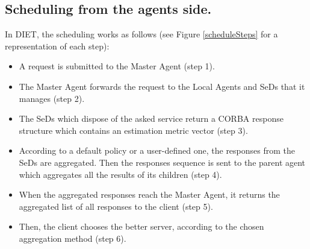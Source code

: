 \subsection{Scheduling from the agents side.}
In DIET, the scheduling works as follows (see Figure \ref{scheduleSteps} for
a representation of each step): 
\begin{itemize}
  \item A request is submitted to the Master Agent (step 1).
  \item The Master Agent forwards the request to the Local Agents and SeDs that
    it manages (step 2).
  \item The SeDs which dispose of the asked service return a CORBA response
    structure which contains an estimation metric vector (step 3).
  \item According to a default policy or a user-defined one, the responses
    from the SeDs are aggregated. Then the responses sequence is sent to
    the parent agent which aggregates all the results of its children (step 4).
  \item When the aggregated responses reach the Master Agent, it returns
    the aggregated list of all responses to the client (step 5).
  \item Then, the client chooses the better server, according to the
    chosen aggregation method (step 6).
\end{itemize}
\newlength{\schdlFigWidth}
\setlength{\schdlFigWidth}{(\textwidth - 3mm) / 3}
